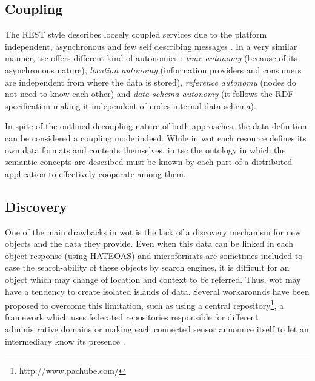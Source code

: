 
\subsection{Coupling}
\label{sec:coupling}
The REST style describes loosely coupled services due to the platform independent, asynchronous and few self describing messages
\citep{pautasso_why_2009}. In a very similar manner, \ac{tsc} offers different kind of autonomies \citep{krummenacher_www_2005}:
\textit{time autonomy} (because of its asynchronous nature), \textit{location autonomy} (information providers and consumers are independent
from where the data is stored), \textit{reference autonomy} (nodes do not need to know each other) and
\textit{data schema autonomy} (it follows the RDF specification making it independent of nodes internal data schema).

In spite of the outlined decoupling nature of both approaches, the data definition can be considered a coupling mode indeed.
While in \ac{wot} each resource defines its own data formats and contents themselves, in \ac{tsc} the ontology in which the semantic
concepts are described must be known by each part of a distributed application to effectively cooperate among them.

\subsection{Discovery}
One of the main drawbacks in \ac{wot} is the lack of a discovery mechanism for new objects and the data they provide. Even when this data can be linked
in each object response (using HATEOAS) and microformats are sometimes included to ease the search-ability of these objects by search engines, it is difficult for an
object which may change of location and context to be referred. Thus, \ac{wot} may have a tendency to create isolated islands of data. Several workarounds
have been proposed to overcome this limitation, such as using a central repository\footnote{http://www.pachube.com/}, a framework which uses federated
repositories responsible for different administrative domains \citep{stirbu_towards_2008} or making each connected sensor announce itself to let an
intermediary know its presence \citep{kamilaris_smart_2010}.

